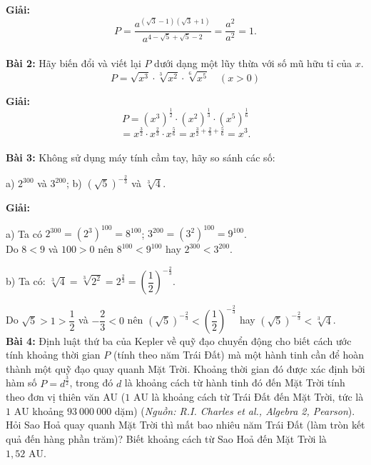 \documentclass{article}
\begin{document}
\textbf{Giải:}
\[
P=\frac{a^{(\sqrt3-1)(\sqrt3+1)}}
{a^{4-\sqrt5+\sqrt5-2}}
=\frac{a^2}{a^2}=1.
\]\\
\textbf{Bài 2:} Hãy biến đổi và viết lại $P$ dưới dạng một lũy thừa với số mũ hữu tỉ của $x$.
\[
P=\sqrt{x^3}\cdot\sqrt[3]{x^2}\cdot\sqrt[6]{x^5}
\quad (x>0)
\]

\textbf{Giải:}
\[
P=(x^3)^{\frac12}\cdot(x^2)^{\frac13}\cdot(x^5)^{\frac16}
\]
\[
=x^{\frac32}\cdot x^{\frac23}\cdot x^{\frac56}
=x^{\frac32+\frac23+\frac56}
=x^3.
\]\\
\textbf{Bài 3:} Không sử dụng máy tính cầm tay, hãy so sánh các số:

\hspace{1.5cm}\noindent a) $2^{300}$ và $3^{200}$; \hfill b) $\left(\sqrt{5}\right)^{-\frac{2}{3}}$ và $\sqrt[3]{4}$. \hspace*{0.2\textwidth}

\textbf{Giải:}

\noindent a) Ta có $2^{300} = (2^3)^{100} = 8^{100}$; $3^{200} = (3^2)^{100} = 9^{100}$.\\
Do $8 < 9$ và $100 > 0$ nên $8^{100} < 9^{100}$ hay $2^{300} < 3^{200}$.

\vspace{0.3cm}

\noindent b) Ta có: $\sqrt[3]{4} = \sqrt[3]{2^2} = 2^{\frac{2}{3}} = \left(\dfrac{1}{2}\right)^{-\frac{2}{3}}$.

\vspace{0.2cm}

\noindent Do $\sqrt{5} > 1 > \dfrac{1}{2}$ và $-\dfrac{2}{3} < 0$ nên $\left(\sqrt{5}\right)^{-\frac{2}{3}} < \left(\dfrac{1}{2}\right)^{-\frac{2}{3}}$ hay $\left(\sqrt{5}\right)^{-\frac{2}{3}} < \sqrt[3]{4}$.\\

\textbf{Bài 4:} Định luật thứ ba của Kepler về quỹ đạo chuyển động cho biết cách ước tính khoảng thời gian $P$ (tính theo năm Trái Đất) mà một hành tinh cần để hoàn thành một quỹ đạo quay quanh Mặt Trời. Khoảng thời gian đó được xác định bởi hàm số $P = d^{\frac{3}{2}}$, trong đó $d$ là khoảng cách từ hành tinh đó đến Mặt Trời tính theo đơn vị thiên văn $\text{AU}$ ($1\text{ AU}$ là khoảng cách từ Trái Đất đến Mặt Trời, tức là $1\text{ AU}$ khoảng $93\ 000\ 000$ dặm) (\textit{Nguồn: R.I. Charles et al., Algebra 2, Pearson}). Hỏi Sao Hoả quay quanh Mặt Trời thì mất bao nhiêu năm Trái Đất (làm tròn kết quả đến hàng phần trăm)? Biết khoảng cách từ Sao Hoả đến Mặt Trời là $1,52\text{ AU}$.

\vspace{0.3cm}
\end{document}
